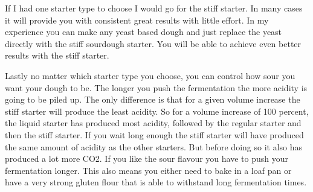 If I had one starter type to choose I would go for the stiff starter. In many cases
it will provide you with consistent great results with little effort.
In my experience you can make any yeast based dough and just replace
the yeast directly with the stiff sourdough starter. You will be able
to achieve even better results with the stiff starter.

Lastly no matter which starter type you choose, you can control how sour
you want your dough to be. The longer you push the fermentation the more
acidity is going to be piled up. The only difference is that for a given
volume increase the stiff starter will produce the least acidity. So for a
volume increase of 100 percent, the liquid starter has produced most acidity,
followed by the regular starter and then the stiff starter. If you wait long
enough the stiff starter will have produced the same amount of acidity as the
other starters. But before doing so it also has produced a lot more CO2. If
you like the sour flavour you have to push your fermentation longer. This also
means you either need to bake in a loaf pan or have a very strong gluten flour
that is able to withstand long fermentation times.

